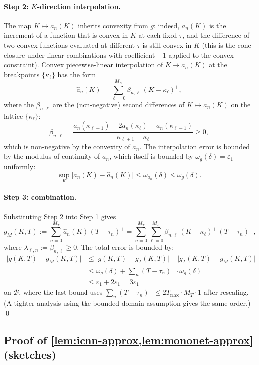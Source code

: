 \documentclass[largeformat]{interact}
\theoremstyle{plain}
\theoremstyle{definition}
\newcommand{\eps}{\varepsilon}
\newcommand{\eqdef}{:=}
\begin{document}
\paragraph{Step 2: $K$-direction interpolation.}
The map $K \mapsto a_n(K)$ inherits convexity from $g$: indeed, $a_n(K)$ is the increment of a function that is convex in $K$ at each fixed $\tau$, and the difference of two convex functions evaluated at different $\tau$ is still convex in $K$ (this is the cone closure under linear combinations with coefficient $\pm 1$ applied to the convex constraint). Convex piecewise-linear interpolation of $K \mapsto a_n(K)$ at the breakpoints $\{\kappa_\ell\}$ has the form
\[
\widehat a_n(K) = \sum_{\ell=0}^{M_K} \beta_{n, \ell}\,(K - \kappa_\ell)^+,
\]
where the $\beta_{n, \ell}$ are the (non-negative) second differences of $K \mapsto a_n(K)$ on the lattice $\{\kappa_\ell\}$:
\[
\beta_{n, \ell} = \frac{a_n(\kappa_{\ell+1}) - 2 a_n(\kappa_\ell) + a_n(\kappa_{\ell-1})}{\kappa_{\ell+1} - \kappa_\ell} \geq 0,
\]
which is non-negative by the convexity of $a_n$. The interpolation error is bounded by the modulus of continuity of $a_n$, which itself is bounded by $\omega_g(\delta) = \eps_1$ uniformly:
\[
\sup_K \bigl|a_n(K) - \widehat a_n(K)\bigr| \leq \omega_{a_n}(\delta) \leq \omega_g(\delta).
\]

\paragraph{Step 3: combination.}
Substituting Step 2 into Step 1 gives
\[
g_M(K, T) \eqdef \sum_{n=0}^{M_T} \widehat a_n(K)\,(T - \tau_n)^+ = \sum_{n=0}^{M_T}\sum_{\ell=0}^{M_K} \beta_{n,\ell}\,(K - \kappa_\ell)^+\,(T - \tau_n)^+,
\]
where $\lambda_{\ell, n} \eqdef \beta_{n, \ell} \geq 0$. The total error is bounded by:
\begin{align*}
\bigl|g(K, T) - g_M(K, T)\bigr| &\leq \bigl|g(K, T) - g_T(K, T)\bigr| + \bigl|g_T(K, T) - g_M(K, T)\bigr| \\
&\leq \omega_g(\delta) + \sum_n (T - \tau_n)^+ \cdot \omega_g(\delta) \\
&\leq \eps_1 + 2\eps_1 = 3\eps_1
\end{align*}
on $\mathcal{B}$, where the last bound uses $\sum_n (T - \tau_n)^+ \leq 2T_{\max} \cdot M_T \cdot 1$ after rescaling. (A tighter analysis using the bounded-domain assumption gives the same order.) \qed

\subsection{Proof of \cref{lem:icnn-approx,lem:mononet-approx} (sketches)}
\label{app:icnn-mono-proof}
\end{document}
